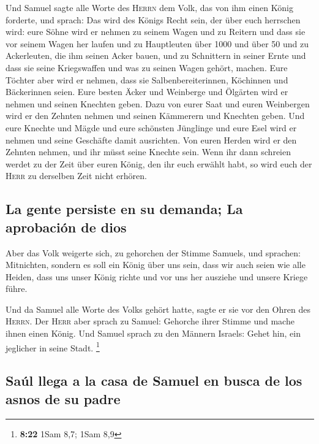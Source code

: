  Und Samuel sagte alle Worte des \textsc{Herrn} dem Volk,
das von ihm einen König forderte,  und sprach: Das wird
des Königs Recht sein, der über euch herrschen wird: eure Söhne wird er
nehmen zu seinem Wagen und zu Reitern und dass sie vor seinem Wagen her
laufen  und zu Hauptleuten über 1000 und über 50 und zu
Ackerleuten, die ihm seinen Acker bauen, und zu Schnittern in seiner
Ernte und dass sie seine Kriegswaffen und was zu seinen Wagen gehört,
machen.  Eure Töchter aber wird er nehmen, dass sie
Salbenbereiterinnen, Köchinnen und Bäckerinnen seien. 
Eure besten Äcker und Weinberge und Ölgärten wird er nehmen und seinen
Knechten geben.  Dazu von eurer Saat und euren Weinbergen
wird er den Zehnten nehmen und seinen Kämmerern und Knechten geben.
 Und eure Knechte und Mägde und eure schönsten Jünglinge
und eure Esel wird er nehmen und seine Geschäfte damit ausrichten.
 Von euren Herden wird er den Zehnten nehmen, und ihr
müsst seine Knechte sein.  Wenn ihr dann schreien werdet
zu der Zeit über euren König, den ihr euch erwählt habt, so wird euch
der \textsc{Herr} zu derselben Zeit nicht erhören.

\hypertarget{la-gente-persiste-en-su-demanda-la-aprobaciuxf3n-de-dios}{%
\subsection{La gente persiste en su demanda; La aprobación de
dios}\label{la-gente-persiste-en-su-demanda-la-aprobaciuxf3n-de-dios}}

 Aber das Volk weigerte sich, zu gehorchen der Stimme
Samuels, und sprachen: Mitnichten, sondern es soll ein König über uns
sein,  dass wir auch seien wie alle Heiden, dass uns
unser König richte und vor uns her ausziehe und unsere Kriege führe.

 Und da Samuel alle Worte des Volks gehört hatte, sagte
er sie vor den Ohren des \textsc{Herrn}.  Der
\textsc{Herr} aber sprach zu Samuel: Gehorche ihrer Stimme und mache
ihnen einen König. Und Samuel sprach zu den Männern Israels: Gehet hin,
ein jeglicher in seine Stadt. \footnote{\textbf{8:22} 1Sam 8,7; 1Sam 8,9}

\hypertarget{sauxfal-llega-a-la-casa-de-samuel-en-busca-de-los-asnos-de-su-padre}{%
\subsection{Saúl llega a la casa de Samuel en busca de los asnos de su
padre}\label{sauxfal-llega-a-la-casa-de-samuel-en-busca-de-los-asnos-de-su-padre}}

